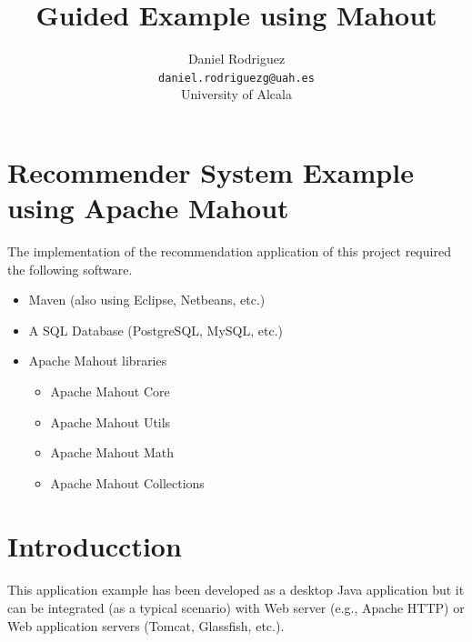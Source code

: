 \documentclass[a4paper,10pt]{article}
\title{Guided Example using Mahout}
\author{Daniel Rodriguez\\\texttt{daniel.rodriguezg@uah.es}\\University of Alcala}
\date{}
\begin{document}
\maketitle

\section{Recommender System Example using Apache Mahout}


The implementation of the recommendation application of this project
required the following software.
\begin{itemize}
\item Maven (also using Eclipse, Netbeans, etc.)
\item A SQL Database (PostgreSQL, MySQL, etc.)
\item Apache Mahout libraries
\begin{itemize}
\item Apache Mahout Core
\item Apache Mahout Utils
\item Apache Mahout Math
\item Apache Mahout Collections
\end{itemize}
\end{itemize}





\section{Introducction}

\paragraph{}
This application example has been developed as a desktop Java application but it can be integrated (as a typical scenario) with Web server (e.g., Apache HTTP) or Web application servers
(Tomcat, Glassfish, etc.).
\end{document}
